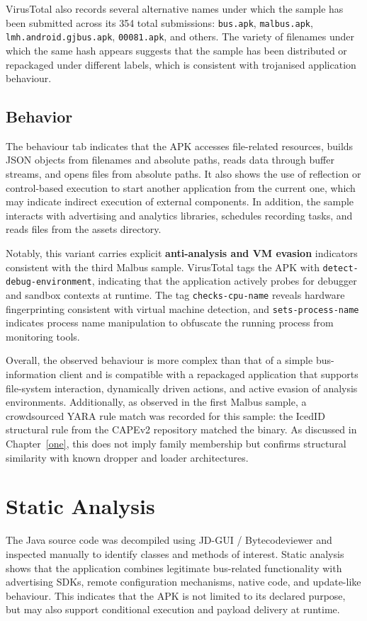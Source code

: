 VirusTotal also records several alternative names under which the sample has been submitted across its 354 total submissions: \texttt{bus.apk}, \texttt{malbus.apk}, \texttt{lmh.android.gjbus.apk}, \texttt{00081.apk}, and others. The variety of filenames under which the same hash appears suggests that the sample has been distributed or repackaged under different labels, which is consistent with trojanised application behaviour.

\subsection{Behavior}

The behaviour tab indicates that the APK accesses file-related resources, builds JSON objects from filenames and absolute paths, reads data through buffer streams, and opens files from absolute paths.
It also shows the use of reflection or control-based execution to start another application from the current one, which may indicate indirect execution of external components. In addition, the sample interacts with advertising and analytics libraries, schedules recording tasks, and reads files from the assets directory.

Notably, this variant carries explicit \textbf{anti-analysis and VM evasion} indicators consistent with the third Malbus sample. VirusTotal tags the APK with \texttt{detect-debug-environment}, indicating that the application actively probes for debugger and sandbox contexts at runtime. The tag \texttt{checks-cpu-name} reveals hardware fingerprinting consistent with virtual machine detection, and \texttt{sets-process-name} indicates process name manipulation to obfuscate the running process from monitoring tools.

Overall, the observed behaviour is more complex than that of a simple bus-information client and is compatible with a repackaged application that supports file-system interaction, dynamically driven actions, and active evasion of analysis environments.
Additionally, as observed in the first Malbus sample, a crowdsourced YARA rule match was recorded for this sample: the IcedID structural rule from the CAPEv2 repository matched the binary. As discussed in Chapter~\ref{one}, this does not imply family membership but confirms structural similarity with known dropper and loader architectures.
\section{Static Analysis}
The Java source code was decompiled using JD-GUI / Bytecodeviewer and inspected manually to identify classes and methods of interest.
Static analysis shows that the application combines legitimate bus-related functionality with advertising SDKs, remote configuration mechanisms, native code, and update-like behaviour. This indicates that the APK is not limited to its declared purpose, but may also support conditional execution and payload delivery at runtime.

